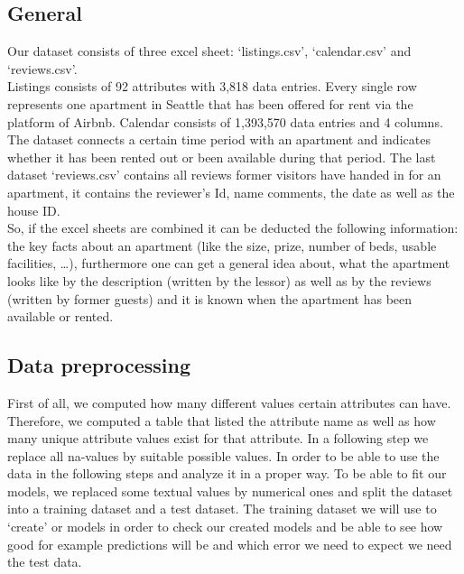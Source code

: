 \documentclass[journal]{IEEEtran}
\begin{document}
\subsection {General}
\noindent Our dataset consists of three excel sheet: ‘listings.csv’, ‘calendar.csv’ and ‘reviews.csv’.\\
Listings consists of 92 attributes with 3,818 data entries. Every single row represents one apartment in Seattle that has been offered for rent via the platform of Airbnb. Calendar consists of 1,393,570 data entries and 4 columns. The dataset connects a certain time period with an apartment and indicates whether it has been rented out or been available during that period. The last dataset ‘reviews.csv’ contains all reviews former visitors have handed in for an apartment, it contains the reviewer’s Id, name comments, the date as well as the house ID.\\So, if the excel sheets are combined it can be deducted the following information: the key facts about an apartment (like the size, prize, number of beds, usable facilities, …), furthermore one can get a general idea about, what the apartment looks like by the description (written by the lessor) as well as by the reviews (written by former guests) and it is known when the apartment has been available or rented.
%
%
\subsection {Data preprocessing}
\noindent First of all, we computed how many different values certain attributes can have. Therefore, we computed a table that listed the attribute name as well as how many unique attribute values exist for that attribute. In a following step we replace all na-values by suitable possible values. In order to be able to use the data in the following steps and analyze it in a proper way. To be able to fit our models, we replaced some textual values by numerical ones and split the dataset into a training dataset and a test dataset. The training dataset we will use to ‘create’ or models in order to check our created models and be able to see how good for example predictions will be and which error we need to expect we need the test data.
%
%
\end{document}
